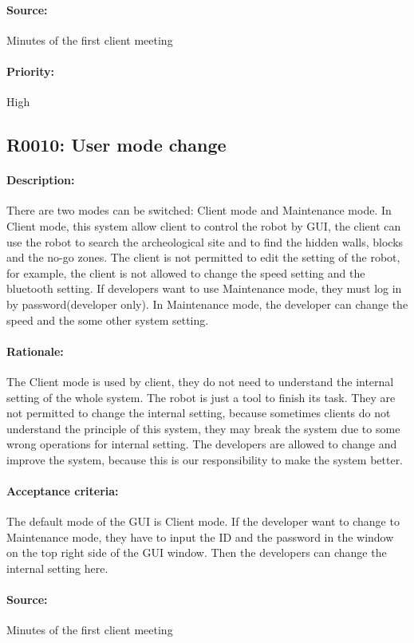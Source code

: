 \documentclass[11pt, a4paper]{report}
\begin{document}
\paragraph{Source:}
 Minutes of the first client meeting 
\paragraph{Priority:}
High 


\subsection{R0010: User mode change}
\paragraph{Description:}
There are two modes can be switched: Client mode and Maintenance mode. In Client mode, this system allow client to control the robot by GUI, the client can use the robot to search the archeological site and to find the hidden walls, blocks and the no-go zones. The client is not permitted to edit the setting of the robot, for example, the client is not allowed to change the speed setting and the bluetooth setting. If developers want to use Maintenance mode, they must log in by password(developer only). In Maintenance mode, the developer can change the speed and the some other system setting.
\paragraph{Rationale:}
The Client mode is used by client, they do not need to understand the internal setting of the whole system. The robot is just a tool to finish its task. They are not permitted to change the internal setting, because sometimes clients do not understand the principle of this system, they may break the system due to some wrong operations for internal setting. The developers are allowed to change and improve the system, because this is our responsibility to make the system better.
\paragraph{Acceptance criteria:}
The default mode of the GUI is Client mode. If the developer want to change to Maintenance mode, they have to input the ID and the password in the window on the top right side of the GUI window. Then the developers can change the internal setting here.
\paragraph{Source:}
 Minutes of the first client meeting 
\end{document}
